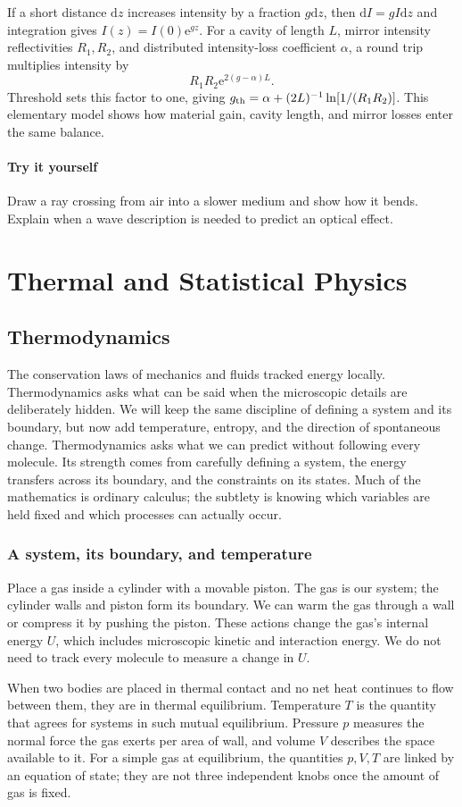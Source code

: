 \documentclass[11pt,oneside]{book}
\newcommand{\dd}{\mathrm{d}}
\newcommand{\ee}{\mathrm{e}}
\theoremstyle{reviewstyle}
\newcommand{\learningcheck}[1]{\subsection*{Try it yourself}\noindent #1\par}
\begin{document}
If a short distance $\dd z$ increases intensity by a fraction $g\dd z$, then $\dd I=gI\dd z$ and integration gives $I(z)=I(0)\ee^{gz}$. For a cavity of length $L$, mirror intensity reflectivities $R_1,R_2$, and distributed intensity-loss coefficient $\alpha$, a round trip multiplies intensity by
\begin{equation}
R_1R_2\ee^{2(g-\alpha)L}.
\end{equation}
Threshold sets this factor to one, giving $g_{\rm th}=\alpha+(2L)^{-1}\ln[1/(R_1R_2)]$. This elementary model shows how material gain, cavity length, and mirror losses enter the same balance.

\learningcheck{Draw a ray crossing from air into a slower medium and show how it bends. Explain when a wave description is needed to predict an optical effect.}

\part{Thermal and Statistical Physics}
\chapter{Thermodynamics}
The conservation laws of mechanics and fluids tracked energy locally. Thermodynamics asks what can be said when the microscopic details are deliberately hidden. We will keep the same discipline of defining a system and its boundary, but now add temperature, entropy, and the direction of spontaneous change.
Thermodynamics asks what we can predict without following every molecule. Its strength comes from carefully defining a system, the energy transfers across its boundary, and the constraints on its states. Much of the mathematics is ordinary calculus; the subtlety is knowing which variables are held fixed and which processes can actually occur.

\section{A system, its boundary, and temperature}
Place a gas inside a cylinder with a movable piston. The gas is our system; the cylinder walls and piston form its boundary. We can warm the gas through a wall or compress it by pushing the piston. These actions change the gas's internal energy $U$, which includes microscopic kinetic and interaction energy. We do not need to track every molecule to measure a change in $U$.

When two bodies are placed in thermal contact and no net heat continues to flow between them, they are in thermal equilibrium. Temperature $T$ is the quantity that agrees for systems in such mutual equilibrium. Pressure $p$ measures the normal force the gas exerts per area of wall, and volume $V$ describes the space available to it. For a simple gas at equilibrium, the quantities $p,V,T$ are linked by an equation of state; they are not three independent knobs once the amount of gas is fixed.
\end{document}
